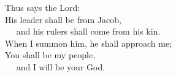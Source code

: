 
\lettrine{T}{}hus says the Lord:\\
His leader shall be from Jacob,\\
   and his rulers shall come from his kin.\\
When I summon him, he shall approach me;\\
You shall be my people, \\
   and I will be your God.
